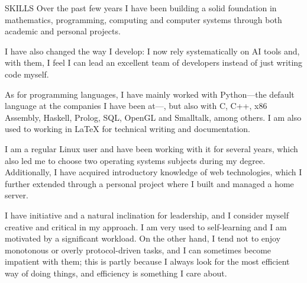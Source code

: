 \documentclass{resume} %
\begin{document}
\begin{rSection}{SKILLS}
  Over the past few years I have been building a solid foundation in
  mathematics, programming, computing and computer systems through both
  academic and personal projects.

  I have also changed the way I develop: I now rely systematically on AI
  tools and, with them, I feel I can lead an excellent team of developers
  instead of just writing code myself.

  As for programming languages, I have mainly worked with Python---the
  default language at the companies I have been at---, but also with C,
  C++, x86 Assembly, Haskell, Prolog, SQL, OpenGL and Smalltalk, among
  others. I am also used to working in \LaTeX{} for technical writing and
  documentation.

  I am a regular Linux user and have been working with it for several
  years, which also led me to choose two operating systems subjects during
  my degree. Additionally, I have acquired introductory knowledge of web
  technologies, which I further extended through a personal project where
  I built and managed a home server.


  I have initiative and a natural inclination for leadership, and I
  consider myself creative and critical in my approach. I am very used to
  self-learning and I am motivated by a significant workload. On the other
  hand, I tend not to enjoy monotonous or overly protocol-driven tasks, and
  I can sometimes become impatient with them; this is partly because I
  always look for the most efficient way of doing things, and efficiency is
  something I care about.
\end{rSection}
\end{document}
